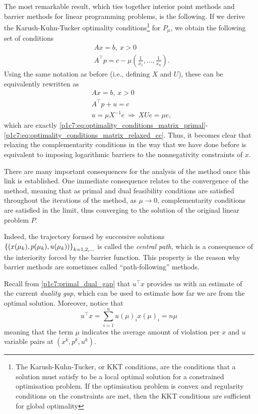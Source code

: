  The most remarkable result, which ties together interior point methods and barrier methods for linear programming problems, is the following. If we derive the Karush-Kuhn-Tucker optimality conditions\footnote{The Karush-Kuhn-Tucker, or KKT conditions, are the conditions that a solution must satisfy to be a local optimal solution for a constrained optimisation problem. If the optimisation problem is convex and regularity conditions on the constraints are met, then the KKT conditions are sufficient for global optimality} for $P_\mu$, we obtain the following set of conditions
	\begin{align*}
		&Ax = b, \ x > 0\\ 
		&A^\top p = c - \mu\left(\frac{1}{x_1},\dots,\frac{1}{x_n}\right).
	\end{align*}
	Using the same notation as before (i.e., defining $X$ and $U$), these can be equivalently rewritten as 
		\begin{align*}
			&Ax = b, \ x > 0 \\ 
			&A^\top p + u = c \\ 
			&u = \mu X^{-1}e ~\Rightarrow~ XUe = \mu e, 
		\end{align*}
	which are exactly \eqref{p1c7:eq:optimality_conditions_matrix_primal}-\eqref{p1c7:eq:optimality_conditions_matrix_relaxed_cc}. Thus, it becomes clear that relaxing the complementarity conditions in the way that we have done before is equivalent to imposing logarithmic barriers to the nonnegativity constraints of $x$. 
	
There are many important consequences for the analysis of the method once this link is established. One immediate consequence relates to the convergence of the method, meaning that as primal and dual feasibility conditions are satisfied throughout the iterations of the method, as $\mu \to 0$, complementarity conditions are satisfied in the limit, thus converging to the solution of the original linear problem $P$. 

Indeed, the trajectory formed by successive solutions $\left\{ (x(\mu_k), p(\mu_k), u(\mu_k)) \right \}_{k=1,2,\dots}$ is called the \emph{central path}, which is a consequence of the interiority forced by the barrier function. This property is the reason why barrier methods are sometimes called ``path-following'' methods.

	Recall from \eqref{p1c7:primal_dual_gap} that $u^\top x$ provides us with an estimate of the current \emph{duality gap}, which can be used to estimate how far we are from the optimal solution. Moreover, notice that
	$$
	u^\top x = \sum_{i =1}^n u(\mu)_i x(\mu)_i = n\mu 
	$$
	meaning that the term $\mu$ indicates the average amount of violation per $x$ and $u$ variable pairs at $(x^k, p^k, u^k)$. 


